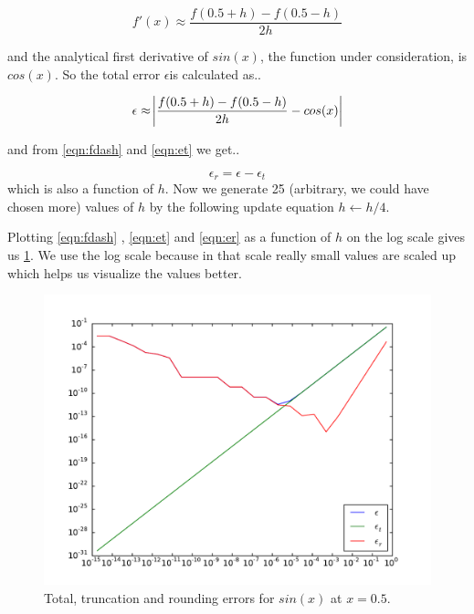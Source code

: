 \documentclass[a4paper,11pt]{article}
\begin{document}
\begin{equation}
f'(x) \approx \frac{f(0.5+h) - f(0.5-h)}{2h}
\end{equation}

and the analytical first derivative of $sin(x)$, the function under consideration, is $cos(x)$. So the total error $\epsilon$is calculated as..

\begin{equation}
\epsilon \approx \abs{\frac{f(0.5+h) - f(0.5-h)}{2h} - cos(x)}
\label{eqn:fdash}
\end{equation}

and from \ref{eqn:fdash} and \ref{eqn:et} we get..

\begin{equation}
\epsilon_r = \epsilon - \epsilon_t
\label{eqn:er}
\end{equation}
which is also a function of $h$. Now we generate 25 (arbitrary, we could have chosen more) values of $h$ by the following update equation $h \leftarrow {h} / {4}$.

Plotting \ref{eqn:fdash} , \ref{eqn:et} and \ref{eqn:er} as a function of $h$ on the log scale gives us \ref{fig:solution1_fig}. We use the log scale because in that scale really small values are scaled up which helps us visualize the values better.

\begin{figure}[h]
\centering
\includegraphics[scale=0.45]{solution1_fig}
\caption{Total, truncation and rounding errors for $sin(x)$ at $x = 0.5$.}
\label{fig:solution1_fig}
\end{figure}
\end{document}

